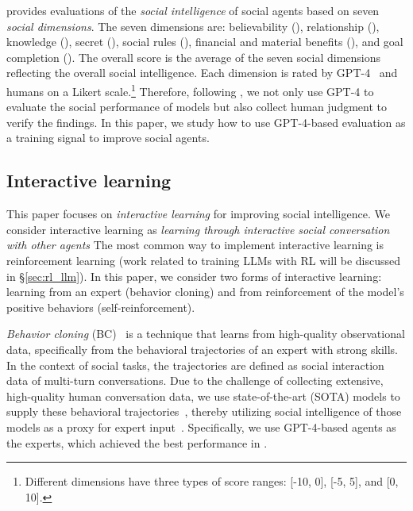 \sotopiaeval \cite{sotopia} provides evaluations of the \emph{social intelligence} of social agents based on seven \emph{social dimensions}. The seven dimensions are: believability (\believability), relationship (\relationship), knowledge (\knowledge), secret (\secret), social rules (\socialrules), financial and material benefits (\financialbenefits), and goal completion (\goalcompletion). The overall score is the average of the seven social dimensions reflecting the overall social intelligence. 
Each dimension is rated by GPT-4~\citep{openai2023gpt4} and humans on a Likert scale.\footnote{Different dimensions have three types of score ranges: [-10, 0], [-5, 5], and [0, 10].} 
Therefore, following \citep{sotopia}, we not only use GPT-4 to evaluate the social performance of models but also collect human judgment to verify the findings. In this paper, we study how to use GPT-4-based evaluation as a training signal to improve social agents. 

\subsection{Interactive learning}
This paper focuses on \emph{interactive learning} for improving social intelligence.
We consider interactive learning as \emph{learning through interactive social conversation with other agents}
The most common way to implement interactive learning is reinforcement learning (work related to training LLMs with RL will be discussed in \S\ref{sec:rl_llm}). In this paper, we consider two forms of interactive learning: learning from an expert (behavior cloning) and from reinforcement of the model's positive behaviors (self-reinforcement). 

\textit{Behavior cloning} (BC)~\citep{pomerleau1988alvinn, torabi2018behavioral} is a technique that learns from high-quality observational data, specifically from the behavioral trajectories of an expert with strong skills. In the context of social tasks, the trajectories are defined as social interaction data of multi-turn conversations. Due to the challenge of collecting extensive, high-quality human conversation data, we use state-of-the-art (SOTA) models to supply these behavioral trajectories~\citep{wang2023self}, thereby utilizing social intelligence of those models as a proxy for expert input~\citep{gandhi2023understanding}. Specifically, we use GPT-4-based agents as the experts, which achieved the best performance in \sotopia \citep{sotopia}.

